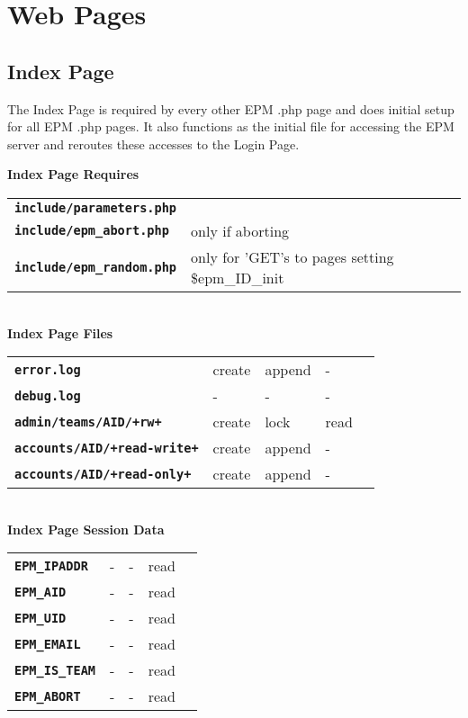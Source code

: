 \documentclass[12pt]{article}
\newcommand{\TT}[1]{{\tt \bfseries #1}}
\begin{document}
\newpage

\section{Web Pages}

\subsection{Index Page}

The Index Page is required by every other EPM .php page
and does initial setup for all EPM .php pages.  It also
functions as the initial file for accessing the EPM
server and reroutes these accesses to the Login Page.

\begin{center}
{\bf Index Page Requires}
\\[1ex]
\begin{tabular}{ll}
\TT{include/parameters.php} \\
\TT{include/epm\_abort.php} & only if aborting \\
\TT{include/epm\_random.php} & only for 'GET's to pages setting
                               \$epm\_ID\_init \\
\end{tabular}
\\[3ex]
{\bf Index Page Files}
\\[1ex]
\begin{tabular}{lllll}
\TT{error.log}			& create  & append & - \\
\TT{debug.log}			& -  & - & - \\
\TT{admin/teams/AID/+rw+}       & create  & lock   & read \\
\TT{accounts/AID/+read-write+}  & create  & append & - \\
\TT{accounts/AID/+read-only+}   & create  & append & - \\
\end{tabular}
\\[3ex]
{\bf Index Page Session Data}
\\[1ex]
\begin{tabular}{lllll}
\TT{EPM\_IPADDR}	& -  & -      & read \\
\TT{EPM\_AID}		& -  & -      & read \\
\TT{EPM\_UID}		& -  & -      & read \\
\TT{EPM\_EMAIL}		& -  & -      & read \\
\TT{EPM\_IS\_TEAM}	& -  & -      & read \\
\TT{EPM\_ABORT}		& -  & -      & read \\

\end{tabular}
\end{center}
\end{document}
